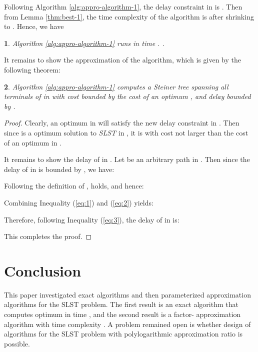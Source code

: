 \documentclass[english,runningheads,a4paper]{llncs}
\newtheorem{thm}{\protect\theoremname}
\newtheorem{lem}[thm]{\protect\lemmaname}
\providecommand{\lemmaname}{Lemma}
\providecommand{\theoremname}{Theorem}
\begin{document}
Following Algorithm \ref{alg:appro-algorithm-1}, the delay constraint
in  is . Then
from Lemma \ref{thm:best-1}, the time complexity of the algorithm
is 
after shrinking  to . Hence, we have
\begin{lem}
\label{lm:best}Algorithm \ref{alg:appro-algorithm-1} runs in time
.
.
\end{lem}
It remains to show the approximation of the algorithm, which is given
by the following theorem:
\begin{thm}
\label{thm:ratio}Algorithm \ref{alg:appro-algorithm-1} computes
a Steiner tree spanning all terminals of  in  with cost bounded
by the cost of an optimum , and delay bounded by .\end{thm}
\begin{proof}
Clearly, an optimum  in  will satisfy the new delay constraint
 in . Then since
 is a optimum solution to \emph{SLST} in , it is with cost
not larger than the cost of an optimum  in .

It remains to show the delay of  in . Let  be an arbitrary
path in . Then since the delay of  in  is bounded by
, we have:




Following the definition of , 
holds, and hence:




Combining Inequality (\ref{eq:1}) and (\ref{eq:2}) yields:




Therefore, following Inequality (\ref{eq:3}), the delay of 
in  is:



This completes the proof.
\end{proof}

\section{Conclusion}

This paper investigated exact algorithms and then parameterized approximation
algorithms for the SLST problem. The first result is an exact algorithm
that computes optimum  in time ,
and the second result is a factor- approximation
algorithm with time complexity .
A problem remained open is whether design of algorithms for the SLST
problem with polylogarithmic approximation ratio is possible.



\end{document}
